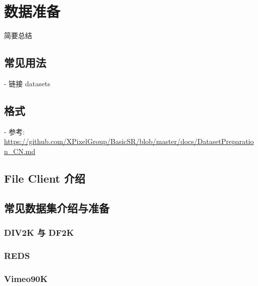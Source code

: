 \documentclass[../main.tex]{subfiles}
\begin{document}
\chapter{数据准备}
\vspace{-2cm}

简要总结

\section{常见用法}

- 链接 datasets

\section{格式}

- 参考: \url{https://github.com/XPixelGroup/BasicSR/blob/master/docs/DatasetPreparation_CN.md}

\section{File Client 介绍}

\section{常见数据集介绍与准备}

\subsection{DIV2K 与 DF2K}

\subsection{REDS}

\subsection{Vimeo90K}
\end{document}
